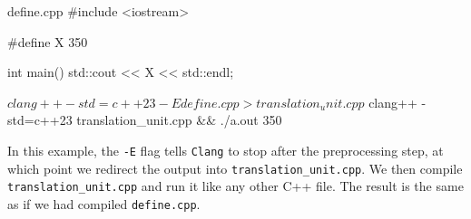 \documentclass[12pt]{article}
\begin{document}
\begin{cxx}{define.cpp}
#include <iostream>

#define X 350

int main() {
	std::cout << X << std::endl;
}
\end{cxx}

\begin{terminal}
$ clang++ -std=c++23 -E define.cpp > translation_unit.cpp
$ clang++ -std=c++23 translation_unit.cpp && ./a.out
350
\end{terminal}

\noindent
In this example, the \texttt{-E} flag tells \texttt{Clang} to stop after the preprocessing step, at which point we redirect the output into \texttt{translation\_unit.cpp}.
We then compile \texttt{translation\_unit.cpp} and run it like any other C++ file.
The result is the same as if we had compiled \texttt{define.cpp}.
\end{document}
